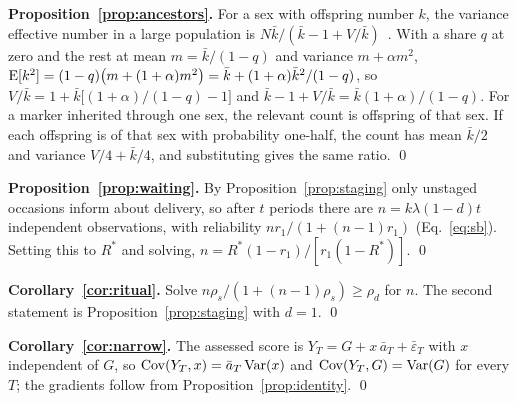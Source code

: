 \textbf{Proposition~\ref{prop:ancestors}.} For a sex with offspring number $k$, the variance effective number in a large
population is $N\bar k/(\bar k-1+V/\bar k)$~\cite{kimura1963}. With a share $q$ at zero and the rest at mean
$m=\bar k/(1-q)$ and variance $m+\alpha m^2$, $\operatorname{E}[k^2]=(1-q)\big(m+(1+\alpha)m^2\big)=\bar k+(1+\alpha)\bar k^2/(1-q)$, so
$V/\bar k=1+\bar k\big[(1+\alpha)/(1-q)-1\big]$ and $\bar k-1+V/\bar k=\bar k(1+\alpha)/(1-q)$. For a marker inherited
through one sex, the relevant count is offspring of that sex. If each offspring is of that sex with probability
one-half, the count has mean $\bar k/2$ and variance $V/4+\bar k/4$, and substituting gives the same ratio. \qed

\textbf{Proposition~\ref{prop:waiting}.} By Proposition~\ref{prop:staging} only unstaged occasions inform about delivery,
so after $t$ periods there are $n=k\lambda(1-d)t$ independent observations, with reliability $nr_1/(1+(n-1)r_1)$
(Eq.~\ref{eq:sb}). Setting this to $R^*$ and solving, $n=R^*(1-r_1)/[r_1(1-R^*)]$. \qed

\textbf{Corollary~\ref{cor:ritual}.} Solve $n\rho_s/(1+(n-1)\rho_s)\ge\rho_d$ for $n$. The second statement is
Proposition~\ref{prop:staging} with $d=1$. \qed

\textbf{Corollary~\ref{cor:narrow}.} The assessed score is $Y_T=G+x\,\bar a_T+\bar\varepsilon_T$ with $x$ independent of
$G$, so $\operatorname{Cov}(Y_T,x)=\bar a_T\operatorname{Var}(x)$ and $\operatorname{Cov}(Y_T,G)=\operatorname{Var}(G)$ for every $T$; the gradients follow from
Proposition~\ref{prop:identity}. \qed
